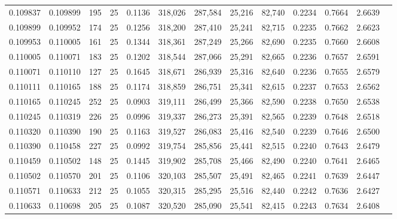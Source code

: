 \begin{tabular}{rrrrrrrrrrrrr}
0.109837 & 0.109899 &   195 &  25 &                                     0.1136 & 318,026 & 287,584 &  25,216 &  82,740 & 0.2234 & 0.7664 & 2.6639 \\
0.109899 & 0.109952 &   174 &  25 &                                     0.1256 & 318,200 & 287,410 &  25,241 &  82,715 & 0.2235 & 0.7662 & 2.6623 \\
0.109953 & 0.110005 &   161 &  25 &                                     0.1344 & 318,361 & 287,249 &  25,266 &  82,690 & 0.2235 & 0.7660 & 2.6608 \\
0.110005 & 0.110071 &   183 &  25 &                                     0.1202 & 318,544 & 287,066 &  25,291 &  82,665 & 0.2236 & 0.7657 & 2.6591 \\
0.110071 & 0.110110 &   127 &  25 &                                     0.1645 & 318,671 & 286,939 &  25,316 &  82,640 & 0.2236 & 0.7655 & 2.6579 \\
0.110111 & 0.110165 &   188 &  25 &                                     0.1174 & 318,859 & 286,751 &  25,341 &  82,615 & 0.2237 & 0.7653 & 2.6562 \\
0.110165 & 0.110245 &   252 &  25 &                                     0.0903 & 319,111 & 286,499 &  25,366 &  82,590 & 0.2238 & 0.7650 & 2.6538 \\
0.110245 & 0.110319 &   226 &  25 &                                     0.0996 & 319,337 & 286,273 &  25,391 &  82,565 & 0.2239 & 0.7648 & 2.6518 \\
0.110320 & 0.110390 &   190 &  25 &                                     0.1163 & 319,527 & 286,083 &  25,416 &  82,540 & 0.2239 & 0.7646 & 2.6500 \\
0.110390 & 0.110458 &   227 &  25 &                                     0.0992 & 319,754 & 285,856 &  25,441 &  82,515 & 0.2240 & 0.7643 & 2.6479 \\
0.110459 & 0.110502 &   148 &  25 &                                     0.1445 & 319,902 & 285,708 &  25,466 &  82,490 & 0.2240 & 0.7641 & 2.6465 \\
0.110502 & 0.110570 &   201 &  25 &                                     0.1106 & 320,103 & 285,507 &  25,491 &  82,465 & 0.2241 & 0.7639 & 2.6447 \\
0.110571 & 0.110633 &   212 &  25 &                                     0.1055 & 320,315 & 285,295 &  25,516 &  82,440 & 0.2242 & 0.7636 & 2.6427 \\
0.110633 & 0.110698 &   205 &  25 &                                     0.1087 & 320,520 & 285,090 &  25,541 &  82,415 & 0.2243 & 0.7634 & 2.6408 \\

\end{tabular}
